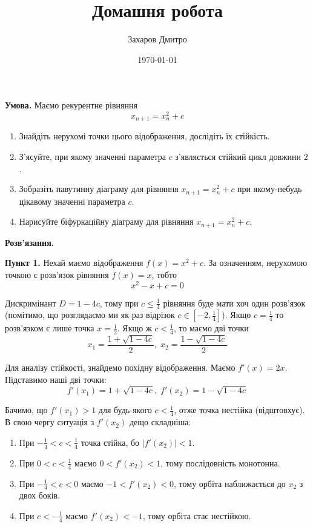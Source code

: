 \documentclass[oneside,solution]{tmpl}
\title{Домашня робота}
\author{Захаров Дмитро}
\date{\today}
\begin{document}
\maketitle


\problem{}

\hspace{20px}\textbf{Умова.} Маємо рекурентне рівняння
\begin{equation}
    x_{n+1} = x_n^2 + c
\end{equation}

\begin{enumerate}
    \item Знайдіть нерухомі точки цього відображення, дослідіть їх стійкість.
    \item З'ясуйте, при якому значенні параметра $c$ з'являється стійкий цикл довжини $2$.
    \item Зобразіть павутинну діаграму для рівняння $x_{n+1} = x_n^2 + c$ при якому-небудь цікавому значенні параметра $c$.
    \item Нарисуйте біфуркаційну діаграму для рівняння $x_{n+1} = x_n^2 + c$.
\end{enumerate}

\textbf{Розв'язання.} 

\textbf{Пункт 1.} Нехай маємо відображення $f(x) = x^2 + c$. За означенням, нерухомою точкою є розв'язок рівняння $f(x) = x$, тобто
\begin{equation}
    x^2 - x + c = 0
\end{equation}

Дискримінант $D = 1-4c$, тому при $c \leq \frac{1}{4}$ рівняння буде мати хоч один розв'язок (помітимо, що розглядаємо ми як раз відрізок $c \in [-2, \frac{1}{4}]$). Якщо $c=\frac{1}{4}$ то розв'язком є лише точка $x = \frac{1}{2}$. Якщо ж $c < \frac{1}{4}$, то маємо дві точки
\begin{equation}
    x_1 = \frac{1 + \sqrt{1-4c}}{2}, \; x_2 = \frac{1-\sqrt{1-4c}}{2}
\end{equation}

Для аналізу стійкості, знайдемо похідну відображення. Маємо $f'(x) = 2x$. Підставимо наші дві точки:
\begin{equation}
    f'(x_1) = 1+\sqrt{1-4c}, \; f'(x_2) = 1 - \sqrt{1 - 4c}
\end{equation}

Бачимо, що $f'(x_1) > 1$ для будь-якого $c < \frac{1}{4}$, отже точка нестійка (відштовхує). В свою чергу ситуація з $f'(x_2)$ дещо складніша:
\begin{enumerate}
    \item При $-\frac{1}{4} < c < \frac{1}{4}$ точка стійка, бо $|f'(x_2)| < 1$.
    \item При $0 < c < \frac{1}{4}$ маємо $0 < f'(x_2) < 1$, тому послідовність монотонна.
    \item При $-\frac{1}{4} < c < 0$ маємо $-1 < f'(x_2) < 0$, тому орбіта наближається до $x_2$ з двох боків.
    \item При $c < -\frac{1}{4}$ маємо $f'(x_2) < -1$, тому орбіта стає нестійкою.
\end{enumerate}
\end{document}
